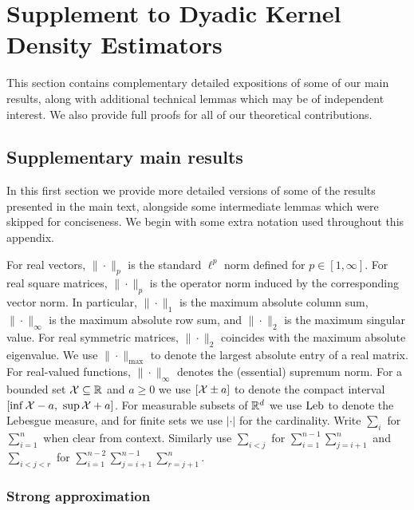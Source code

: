
\chapter{Supplement to Dyadic Kernel Density Estimators}
\label{app:kernel}

This section contains complementary detailed expositions of some
of our main results, along with additional technical lemmas
which may be of independent interest. We also provide full proofs
for all of our theoretical contributions.

\section{Supplementary main results}

In this first section we provide more detailed versions of some of the
results presented in the main text, alongside some intermediate
lemmas which were skipped for conciseness.
We begin with some extra notation used throughout this appendix.

For real vectors,
$\|\cdot\|_p$ is the standard $\ell^p$
norm defined for $p \in [1, \infty]$.
For real square matrices,
$\|\cdot\|_p$ is the operator
norm induced by the corresponding vector norm.
In particular,
$\|\cdot\|_1$
is the maximum absolute column sum,
$\|\cdot\|_\infty$
is the maximum absolute row sum,
and $\|\cdot\|_2$
is the maximum singular value.
For real symmetric matrices,
$\|\cdot\|_2$
coincides with the maximum absolute eigenvalue.
We use $\|\cdot\|_{\max}$
to denote the largest absolute entry of a real matrix.
For real-valued functions,
$\|\cdot\|_\infty$
denotes the (essential) supremum norm.
For a bounded set $\mathcal{X} \subseteq \mathbb{R}$ and $a \geq 0$
we use $[\mathcal{X} \pm a]$ to denote the compact interval
$[\inf \mathcal{X} - a, \ \sup \mathcal{X} + a]$.
For measurable subsets of $\mathbb{R}^d$
we use $\operatorname{Leb}$ to denote the Lebesgue measure,
and for finite sets we use $|\cdot|$
for the cardinality.
Write $\sum_i$
for $\sum_{i=1}^n$
when clear from context.
Similarly use $\sum_{i<j}$
for $\sum_{i=1}^{n-1} \sum_{j=i+1}^n$
and $\sum_{i<j<r}$
for $\sum_{i=1}^{n-2} \sum_{j=i+1}^{n-1} \sum_{r=j+1}^n$.

\subsection{Strong approximation}
\label{sec:kernel_app_strong_approx}

